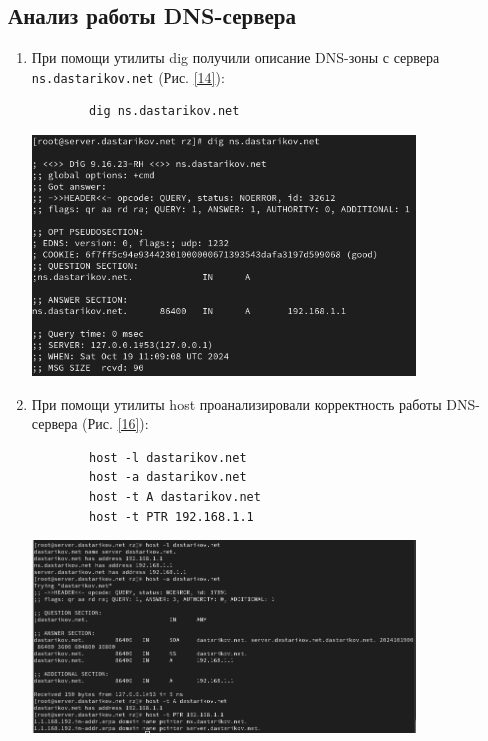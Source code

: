 \subsection{Анализ работы DNS-сервера}
\begin{enumerate}
    \item При помощи утилиты dig получили описание DNS-зоны с сервера {\tt ns.dastarikov.net} (Рис. \ref{14}):
        \begin{verbatim}
        dig ns.dastarikov.net
        \end{verbatim}

\begin{center}
    \centering
    \includegraphics[width=0.8\textwidth]{../images/image14.png}
    \label{14}
\end{center}

    \item При помощи утилиты host проанализировали корректность работы DNS-сервера (Рис. \ref{16}):
        \begin{verbatim}
        host -l dastarikov.net
        host -a dastarikov.net
        host -t A dastarikov.net
        host -t PTR 192.168.1.1
        \end{verbatim}

\begin{center}
    \centering
    \includegraphics[width=0.8\textwidth]{../images/image16.png}
    \label{16}
\end{center}

\end{enumerate}

